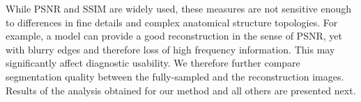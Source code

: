 \documentclass[10pt,journal,compsoc]{IEEEtran}
\begin{document}

%		

While PSNR and SSIM are widely used, these measures are not sensitive enough to differences in fine details and complex anatomical structure topologies. For example, a model can provide a good reconstruction in the sense of PSNR, yet with blurry edges and therefore loss of high frequency information. This may significantly affect diagnostic usability. We therefore further compare segmentation quality between the fully-sampled and the reconstruction images. Results of the analysis obtained for our method and all others are presented next.
\end{document}
